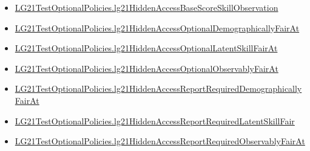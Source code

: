 \documentclass[10pt]{article}
\begin{document}
\begin{itemize}
\item \hyperlink{governing-declaration-52712eb1079dfba5}{LG21\allowbreak{}Test\allowbreak{}Optional\allowbreak{}Policies.\allowbreak{}lg21\allowbreak{}Hidden\allowbreak{}Access\allowbreak{}Base\allowbreak{}Score\allowbreak{}Skill\allowbreak{}Observation}
\item \hyperlink{governing-declaration-1ca050abfb4fe905}{LG21\allowbreak{}Test\allowbreak{}Optional\allowbreak{}Policies.\allowbreak{}lg21\allowbreak{}Hidden\allowbreak{}Access\allowbreak{}Optional\allowbreak{}Demographically\allowbreak{}Fair\allowbreak{}At}
\item \hyperlink{governing-declaration-4e36f00742fff499}{LG21\allowbreak{}Test\allowbreak{}Optional\allowbreak{}Policies.\allowbreak{}lg21\allowbreak{}Hidden\allowbreak{}Access\allowbreak{}Optional\allowbreak{}Latent\allowbreak{}Skill\allowbreak{}Fair\allowbreak{}At}
\item \hyperlink{governing-declaration-788e06d054b3d2b3}{LG21\allowbreak{}Test\allowbreak{}Optional\allowbreak{}Policies.\allowbreak{}lg21\allowbreak{}Hidden\allowbreak{}Access\allowbreak{}Optional\allowbreak{}Observably\allowbreak{}Fair\allowbreak{}At}
\item \hyperlink{governing-declaration-bfa63f264e41ff4f}{LG21\allowbreak{}Test\allowbreak{}Optional\allowbreak{}Policies.\allowbreak{}lg21\allowbreak{}Hidden\allowbreak{}Access\allowbreak{}Report\allowbreak{}Required\allowbreak{}Demographically\allowbreak{}Fair\allowbreak{}At}
\item \hyperlink{governing-declaration-15f0f4a4905aa4d9}{LG21\allowbreak{}Test\allowbreak{}Optional\allowbreak{}Policies.\allowbreak{}lg21\allowbreak{}Hidden\allowbreak{}Access\allowbreak{}Report\allowbreak{}Required\allowbreak{}Latent\allowbreak{}Skill\allowbreak{}Fair}
\item \hyperlink{governing-declaration-b8fe8b2e72eb28c0}{LG21\allowbreak{}Test\allowbreak{}Optional\allowbreak{}Policies.\allowbreak{}lg21\allowbreak{}Hidden\allowbreak{}Access\allowbreak{}Report\allowbreak{}Required\allowbreak{}Observably\allowbreak{}Fair\allowbreak{}At}
\end{itemize}
\end{document}
